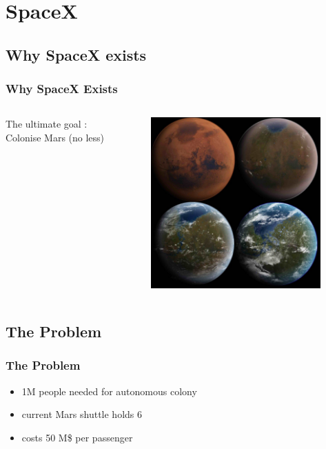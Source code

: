\section{SpaceX}

{
\logo{}
\subsection{Why SpaceX exists}

\begin{frame}
\frametitle{Why SpaceX Exists}

    \begin{columns}
        \begin{column}{45mm}
        The ultimate goal : \\Colonise Mars (no less)
        \end{column}
        \begin{column}{65mm}
\includegraphics[width=65mm]{images/mars_transition}
        \end{column}
    \end{columns}
\end{frame}
}


\subsection{The Problem}

\begin{frame}
    \frametitle{The Problem}
    \begin{itemize}
        \item 1M people needed for autonomous colony \pause
        \item current Mars shuttle holds 6 \pause
        \item costs 50 M\$ per passenger
    \end{itemize}
\end{frame}

